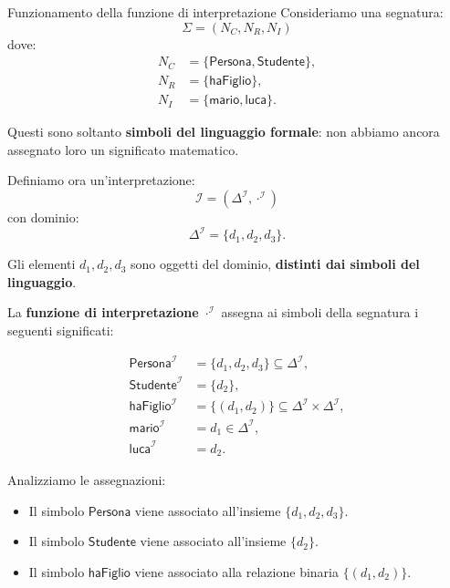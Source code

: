 \begin{example}{Funzionamento della funzione di interpretazione}
    Consideriamo una segnatura:
    \[
        \Sigma=(N_C,N_R,N_I)
    \]
    dove:
    \[
    \begin{aligned}
        N_C &= \{\mathsf{Persona},\mathsf{Studente}\},\\
        N_R &= \{\mathsf{haFiglio}\},\\
        N_I &= \{\mathsf{mario},\mathsf{luca}\}.
    \end{aligned}
    \]

    Questi sono soltanto \textbf{simboli del linguaggio
    formale}: non abbiamo ancora assegnato loro
    un significato matematico.

    Definiamo ora un'interpretazione:
    \[
        \mathcal I =
        (\Delta^{\mathcal I},\cdot^{\mathcal I})
    \]
    con dominio:
    \[
        \Delta^{\mathcal I}=\{d_1,d_2,d_3\}.
    \]

    Gli elementi $d_1,d_2,d_3$ sono oggetti
    del dominio, \textbf{distinti dai simboli del linguaggio}.

    La \textbf{funzione di interpretazione}
    $\cdot^{\mathcal I}$ assegna ai simboli
    della segnatura i seguenti significati:

    \[
    \begin{aligned}
        \mathsf{Persona}^{\mathcal I}
        &= \{d_1,d_2,d_3\} \subseteq \Delta^{\mathcal I} ,\\
        \mathsf{Studente}^{\mathcal I}
        &= \{d_2\},\\
        \mathsf{haFiglio}^{\mathcal I}
        &= \{(d_1,d_2)\} \subseteq \Delta^{\mathcal I} \times \Delta^{\mathcal I}  ,\\
        \mathsf{mario}^{\mathcal I}
        &= d_1 \in \Delta^{\mathcal I},\\
        \mathsf{luca}^{\mathcal I}
        &= d_2.
    \end{aligned}
    \]

    Analizziamo le assegnazioni:

    \begin{itemize}
        \item Il simbolo $\mathsf{Persona}$ viene
        associato all'insieme $\{d_1,d_2,d_3\}$.

        \item Il simbolo $\mathsf{Studente}$ viene
        associato all'insieme $\{d_2\}$.

        \item Il simbolo $\mathsf{haFiglio}$ viene
        associato alla relazione binaria
        $\{(d_1,d_2)\}$.


\end{itemize}
\end{example}
